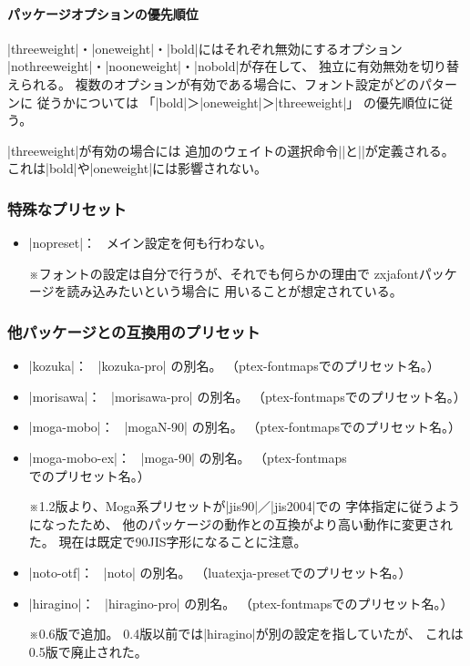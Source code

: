 \documentclass[xelatex,ja=standard,jafont=haranoaji,
  a4paper]{bxjsarticle}
\newcommand{\Pkg}[1]{\textsf{#1}}
\newcommand{\Note}{\par\noindent ※}
\newcommand{\Means}{：\ }
\newcommand{\JSl}{\mbox{／}\linebreak[0]}
\begin{document}
\paragraph{パッケージオプションの優先順位}

|threeweight|・|oneweight|・|bold|にはそれぞれ無効にするオプション%
|nothreeweight|・|nooneweight|・|nobold|が存在して、
独立に有効無効を切り替えられる。
複数のオプションが有効である場合に、フォント設定がどのパターンに
従うかについては
「|bold|＞|oneweight|＞|threeweight|」
の優先順位に従う。

|threeweight|が有効の場合には
追加のウェイトの選択命令|\ltseries|と|\ebseries|が定義される。
これは|bold|や|oneweight|には影響されない。

\subsubsection{特殊なプリセット}

\begin{itemize}
\item |nopreset|\Means
  メイン設定を何も行わない。
  \Note フォントの設定は自分で行うが、それでも何らかの理由で
  \Pkg{zxjafont}パッケージを読み込みたいという場合に
  用いることが想定されている。
\end{itemize}

\subsubsection{他パッケージとの互換用のプリセット}

\begin{itemize}
\item |kozuka|\Means
  |kozuka-pro| の別名。
  （\Pkg{ptex-fontmaps}でのプリセット名。）
\item |morisawa|\Means
  |morisawa-pro| の別名。
  （\Pkg{ptex-fontmaps}でのプリセット名。）
\item |moga-mobo|\Means
  |mogaN-90| の別名。
  （\Pkg{ptex-fontmaps}でのプリセット名。）
\item |moga-mobo-ex|\Means
  |moga-90| の別名。
  （\Pkg{ptex-fontmaps}でのプリセット名。）
  \Note 1.2版より、Moga系プリセットが|jis90|\JSl|jis2004|での
  字体指定に従うようになったため、
  他のパッケージの動作との互換がより高い動作に変更された。
  現在は既定で90JIS字形になることに注意。
\item |noto-otf|\Means
  |noto| の別名。
  （\Pkg{luatexja-preset}でのプリセット名。）
\item |hiragino|\Means
  |hiragino-pro| の別名。
  （\Pkg{ptex-fontmaps}でのプリセット名。）
  \Note 0.6版で追加。
  0.4版以前では|hiragino|が別の設定を指していたが、
  これは0.5版で廃止された。
\end{itemize}
\end{document}
